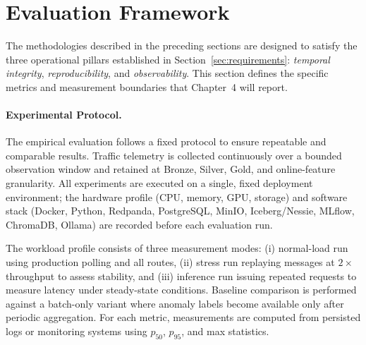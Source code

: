   \section{Evaluation Framework}                                                                                                                          
  \label{sec:evaluation}                                                                                                                                  
                                                                                                                                                          
  The methodologies described in the preceding sections are designed                                                                                      
  to satisfy the three operational pillars established in
  Section~\ref{sec:requirements}: \textit{temporal integrity},                                                                                            
  \textit{reproducibility}, and \textit{observability}. This section                                                                                      
  defines the specific metrics and measurement boundaries that                                                                                            
  Chapter~4 will report.                                                                                                                                  

  \paragraph{Experimental Protocol.}
  The empirical evaluation follows a fixed protocol to ensure repeatable and comparable results. Traffic telemetry is collected continuously over a bounded observation window and retained at Bronze, Silver, Gold, and online-feature granularity. All experiments are executed on a single, fixed deployment environment; the hardware profile (CPU, memory, GPU, storage) and software stack (Docker, Python, Redpanda, PostgreSQL, MinIO, Iceberg/Nessie, MLflow, ChromaDB, Ollama) are recorded before each evaluation run.

  The workload profile consists of three measurement modes: (i) normal-load run using production polling and all routes, (ii) stress run replaying messages at $2\times$ throughput to assess stability, and (iii) inference run issuing repeated requests to measure latency under steady-state conditions. Baseline comparison is performed against a batch-only variant where anomaly labels become available only after periodic aggregation. For each metric, measurements are computed from persisted logs or monitoring systems using $p_{50}$, $p_{95}$, and max statistics.

